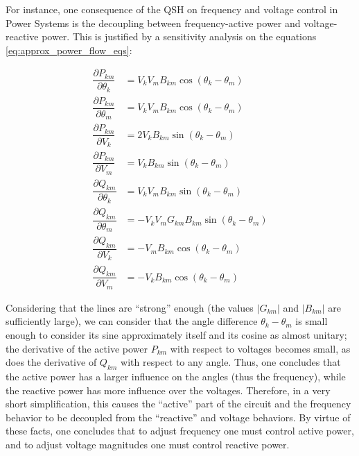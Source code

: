 	For instance, one consequence of the QSH on frequency and voltage control in Power Systems is the decoupling between frequency-active power and voltage-reactive power. This is justified by a sensitivity analysis on the equations \eqref{eq:approx_power_flow_eqs}:

\begin{align}
        \dfrac{\partial P_{km}}{\partial \theta_k} &= V_k V_m B_{km}\cos\left(\theta_k - \theta_m\right) \\[5mm]
%
        \dfrac{\partial P_{km}}{\partial \theta_m} &= V_kV_m B_{km}\cos\left(\theta_k - \theta_m\right) \\[5mm]
        \dfrac{\partial P_{km}}{\partial V_k} &= 2V_k B_{km}\sin\left(\theta_k - \theta_m\right) \\[5mm]
        \dfrac{\partial P_{km}}{\partial V_m} &= V_k B_{km}\sin\left(\theta_k - \theta_m\right) \\[5mm]
        \dfrac{\partial Q_{km}}{\partial\theta_k} &= V_kV_m B_{km}\sin\left(\theta_k - \theta_m\right) \\[5mm]
        \dfrac{\partial Q_{km}}{\partial\theta_m} &= -V_kV_m G_{km} B_{km}\sin\left(\theta_k - \theta_m\right) \\[5mm]
        \dfrac{\partial Q_{km}}{\partial V_k} &= -V_m B_{km}\cos\left(\theta_k - \theta_m\right) \\[5mm]
        \dfrac{\partial Q_{km}}{\partial V_m} &= - V_k B_{km}\cos\left(\theta_k - \theta_m\right)
\end{align}

	Considering that the lines are ``strong'' enough (the values $\left\lvert G_{km}\right\rvert$ and $\left\lvert B_{km}\right\rvert$ are sufficiently large), we can consider that the angle difference $\theta_k - \theta_m$ is small enough to consider its sine approximately itself and its cosine as almost unitary; the derivative of the active power $P_{km}$ with respect to voltages becomes small, as does the derivative of $Q_{km}$ with respect to any angle. Thus, one concludes that the active power has a larger influence on the angles (thus the frequency), while the reactive power has more influence over the voltages. Therefore, in a very short simplification, this causes the ``active'' part of the circuit and the frequency behavior to be decoupled from the ``reactive'' and voltage behaviors. By virtue of these facts, one concludes that to adjust frequency one must control active power, and to adjust voltage magnitudes one must control reactive power.

